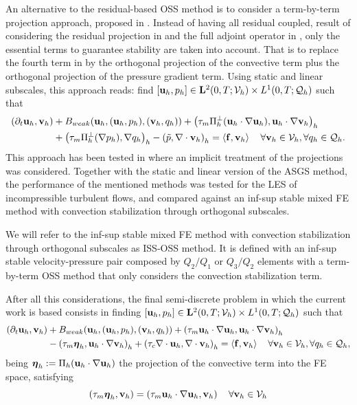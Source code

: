 An alternative to the residual-based OSS method is to consider a term-by-term projection approach, proposed in \cite{codina_analysis_2008}. Instead of having all residual coupled, result of considering the residual projection in  and the full adjoint operator in , only the essential terms to guarantee stability are taken into account. That is to replace the fourth term in  by the orthogonal projection of the convective term plus the orthogonal projection of the pressure gradient term. Using static and linear subscales, this approach reads: find 
$[{\bf u}_h,p_h]\in\mathbf{L}^2(0,T;\mathcal{V}_{h})\times L^1(0,T;\mathcal{Q}_{h})$ such that
\begin{align}
\label{eq-C7_NS_vms_tbtoss}
(\partial_t{\bf u}_h,{\bf v}_h)&+B_{weak}({\bf u}_h,({\bf u}_h,p_h),({\bf v}_h,q_h))+\left(\tau_m\Pi_h^\perp({\bf u}_h\cdot\nabla{\bf u}_h),{\bf u}_h\cdot\nabla{\bf v}_h\right)_h\\\nonumber
&+\left(\tau_m\Pi_h^\perp(\nabla p_h),\nabla q_h\right)_h-\left(\tilde{p},\nabla\cdot{\bf v}_h\right)_h=\left<{\bf f},{\bf v}_h\right>
\quad\forall{\bf v}_h\in\mathcal{V}_{h},\forall q_h\in\mathcal{Q}_{h}.
\end{align}
This approach has been tested in  where an implicit treatment of the projections was considered. Together with the static and linear version of the ASGS method, the performance of the mentioned methods was tested for the LES of incompressible turbulent flows, and compared against an inf-sup stable mixed FE method with convection stabilization through orthogonal subscales.

We will refer to the inf-sup stable mixed FE method with convection stabilization through orthogonal subscales as ISS-OSS method. It is defined with an inf-sup stable velocity-pressure pair composed by $ Q_2/Q_1 $ or $ Q_3/Q_2 $ elements with a term-by-term OSS method that only considers the convection stabilization term.

After all this considerations, the final semi-discrete problem in which the current work is based consists in finding 
$[{\bf u}_h,p_h]\in\mathbf{L}^2(0,T;\mathcal{V}_{h})\times L^1(0,T;\mathcal{Q}_{h})$ such that
\begin{align}
\label{eq-C7_NS_vms_mfe_oss}
(\partial_t{\bf u}_h,{\bf v}_h)&+B_{weak}({\bf u}_h,({\bf u}_h,p_h),({\bf v}_h,q_h))+\left(\tau_m{\bf u}_h\cdot\nabla{\bf u}_h,{\bf u}_h\cdot\nabla{\bf v}_h\right)_h\\\nonumber
&-\left(\tau_m\boldsymbol{\eta}_h,{\bf u}_h\cdot\nabla{\bf v}_h\right)_h+\left(\tau_c\nabla\cdot{\bf u}_h,\nabla\cdot{\bf v}_h\right)_h=\left<{\bf f},{\bf v}_h\right>
\quad\forall{\bf v}_h\in\mathcal{V}_{h},\forall q_h\in\mathcal{Q}_{h},
\end{align}
being $ \boldsymbol{\eta}_h:=\Pi_h({\bf u}_h\cdot\nabla{\bf u}_h) $ the projection of the convective term into the FE space, satisfying
\begin{equation}
\label{eq-C7_NS_projection}
\left(\tau_m\boldsymbol{\eta}_h,{\bf v}_h\right)=\left(\tau_m{\bf u}_h\cdot\nabla{\bf u}_h,{\bf v}_h\right)\quad\forall{\bf v}_h\in\mathcal{V}_{h}
\end{equation}

